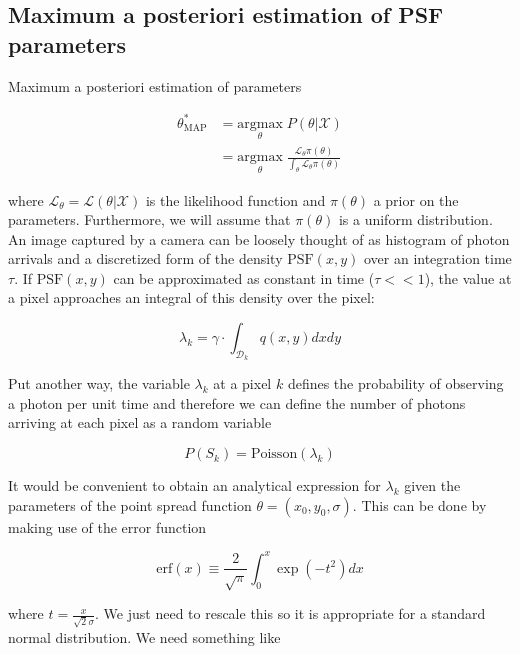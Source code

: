 \documentclass{ucetd}
\begin{document}
\subsection{Maximum a posteriori estimation of PSF parameters}

Maximum a posteriori estimation of parameters

\begin{align*}
\theta^{*}_{\mathrm{MAP}} &= \underset{\theta}{\mathrm{argmax}} \;P(\theta|\mathcal{X})\\
&= \underset{\theta}{\mathrm{argmax}} \;\frac{\mathcal{L}_{\theta}\pi(\theta)}{\int_{\theta}\mathcal{L}_{\theta}\pi(\theta)}
\end{align*}


where $\mathcal{L}_{\theta} = \mathcal{L}(\theta|\mathcal{X})$ is the likelihood function and $\pi(\theta)$ a prior on the parameters. Furthermore, we will assume that $\pi(\theta)$ is a uniform distribution. An image captured by a camera can be loosely thought of as histogram of photon arrivals and a discretized form of the density $\mathrm{PSF}(x,y)$ over an integration time $\tau$. If $\mathrm{PSF}(x,y)$ can be approximated as constant in time ($\tau << 1$), the value at a pixel approaches an integral of this density over the pixel:

\begin{equation}
\lambda_{k} = \gamma\cdot\int_{\mathcal{D}_{k}} q(x,y)dxdy
\end{equation}

Put another way, the variable $\lambda_{k}$ at a pixel $k$ defines the probability of observing a photon per unit time and therefore we can define the number of photons arriving at each pixel as a random variable

\begin{equation*}
P(S_{k}) = \mathrm{Poisson}(\lambda_{k})
\end{equation*}


It would be convenient to obtain an analytical expression for $\lambda_{k}$ given the parameters of the point spread function $\theta = (x_0,y_0,\sigma)$. This can be done by making use of the error function

\begin{equation*}
\mathrm{erf}(x) \equiv \frac{2}{\sqrt{\pi}}\int_{0}^{x} \exp(-t^{2})dx
\end{equation*}

where $t = \frac{x}{\sqrt{2}\sigma}$. We just need to rescale this so it is appropriate for a standard normal distribution. We need something like
\end{document}

